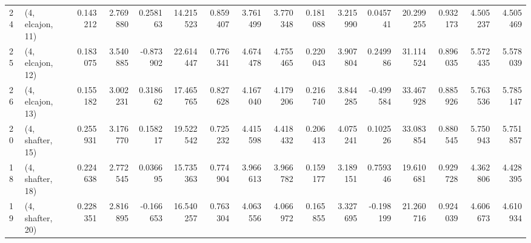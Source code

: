 \begin{tabular}{llrrrrrrrrrrrrrr}
24 &  (4, elcajon, 11) &   0.143212 &  2.769880 &  0.258163 &  14.215523 &  0.859407 &   3.761499 &  3.770348 &  0.181088 &  3.215990 &  0.045741 &   20.299255 &  0.932173 &   4.505237 &   4.505469 \\
25 &  (4, elcajon, 12) &   0.183075 &  3.540885 & -0.873902 &  22.614447 &  0.776341 &   4.674478 &  4.755465 &  0.220043 &  3.907804 &  0.249986 &   31.114524 &  0.896035 &   5.572435 &   5.578039 \\
26 &  (4, elcajon, 13) &   0.155182 &  3.002231 &  0.318662 &  17.465765 &  0.827628 &   4.167040 &  4.179206 &  0.216740 &  3.844285 & -0.499584 &   33.467928 &  0.885926 &   5.763536 &   5.785147 \\
20 &  (4, shafter, 15) &   0.255931 &  3.176770 &  0.158217 &  19.522542 &  0.725232 &   4.415598 &  4.418432 &  0.206413 &  4.075241 &  0.102526 &   33.083854 &  0.880545 &   5.750943 &   5.751857 \\
18 &  (4, shafter, 18) &   0.224638 &  2.772545 &  0.036695 &  15.735363 &  0.774904 &   3.966613 &  3.966782 &  0.159177 &  3.189151 &  0.759346 &   19.610681 &  0.929728 &   4.362806 &   4.428395 \\
19 &  (4, shafter, 20) &   0.228351 &  2.816895 & -0.166653 &  16.540257 &  0.763304 &   4.063556 &  4.066972 &  0.165855 &  3.327695 & -0.198199 &   21.260716 &  0.924039 &   4.606673 &   4.610934 \\
\bottomrule
\end{tabular}
